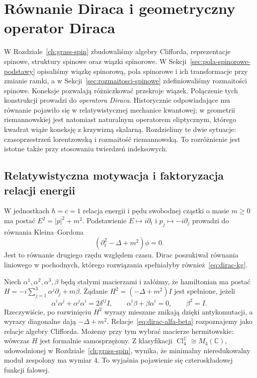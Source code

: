 \section{Równanie Diraca i geometryczny operator Diraca}
\label{sec:rownanie-diraca}

W Rozdziale~\ref{ch:grass-spin} zbudowaliśmy
algebry Clifforda, reprezentacje spinowe,
struktury spinowe oraz wiązki spinorowe.
W Sekcji~\ref{sec:pola-spinorowe-podstawy} opisaliśmy
wiązkę spinorową, pola spinorowe i ich transformacje
przy zmianie ramki, a w Sekcji~\ref{sec:rozmaitosci-spinowe}
zdefiniowaliśmy rozmaitości spinowe.
Koneksje pozwalają różniczkować przekroje wiązek.
Połączenie tych konstrukcji prowadzi
do \emph{operatora Diraca}. Historycznie odpowiadające mu równanie
pojawiło się w relatywistycznej mechanice kwantowej; w geometrii
riemannowskiej jest natomiast naturalnym operatorem eliptycznym,
którego kwadrat wiąże koneksję z krzywizną skalarną.
Rozdzielimy te dwie sytuacje: czasoprzestrzeń lorentzowską
i rozmaitość riemannowską. To rozróżnienie jest istotne także
przy stosowaniu twierdzeń indeksowych.

\subsection{Relatywistyczna motywacja i faktoryzacja relacji energii}

W jednostkach $\hbar=c=1$ relacja energii i pędu
swobodnej cząstki o masie $m\geq0$ ma postać
$E^2=|p|^2+m^2$. Podstawienie $E\mapsto i\partial_t$
i $p_j\mapsto-i\partial_j$ prowadzi do równania
Kleina--Gordona
\begin{equation}\label{eq:dirac-kg}
 (\partial_t^2-\Delta+m^2)\phi=0.
\end{equation}
Jest to równanie drugiego rzędu względem czasu.
Dirac poszukiwał równania liniowego w pochodnych,
którego rozwiązania spełniałyby również~\eqref{eq:dirac-kg}.

Niech $\alpha^1,\alpha^2,\alpha^3,\beta$ będą stałymi
macierzami i załóżmy, że hamiltonian ma postać
$H=-i\sum_{j=1}^3\alpha^j\partial_j+m\beta$.
Żądanie $H^2=(-\Delta+m^2)I$ jest spełnione, jeżeli
\begin{equation}\label{eq:dirac-alfa-beta}
 \alpha^i\alpha^j+\alpha^j\alpha^i=2\delta^{ij}I,
 \qquad \alpha^i\beta+\beta\alpha^i=0,
 \qquad \beta^2=I.
\end{equation}
Rzeczywiście, po rozwinięciu $H^2$ wyrazy mieszane
znikają dzięki antykomutacji, a wyrazy diagonalne dają
$-\Delta+m^2$. Relacje~\eqref{eq:dirac-alfa-beta}
rozpoznajemy jako relacje algebry Clifforda.
Możemy przy tym wybrać macierze hermitowskie: wówczas $H$
jest formalnie samosprzężony. Z klasyfikacji
$\operatorname{Cl}^{\mathbb C}_4\cong M_4(\mathbb C)$,
udowodnionej w Rozdziale~\ref{ch:grass-spin}, wynika,
że minimalny nieredukowalny moduł zespolony ma wymiar $4$.
To wyjaśnia pojawienie się czteroskładowej funkcji falowej.

